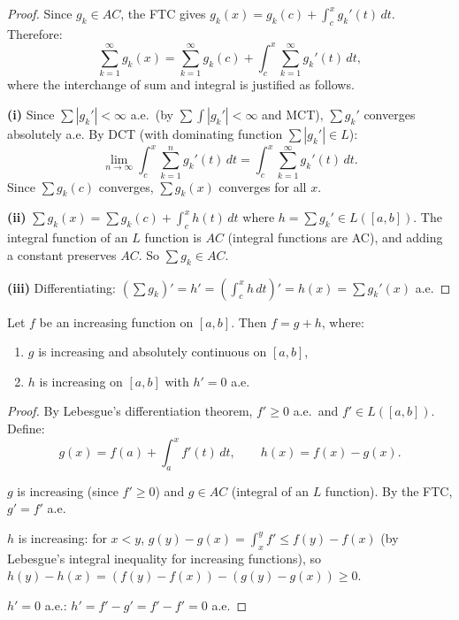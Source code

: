 \documentclass[11pt]{report}
\begin{document}
\begin{proof}
Since $g_k \in AC$, the FTC gives $g_k(x) = g_k(c) + \int_c^x g_k'(t)\,dt$. Therefore:
\[
\sum_{k=1}^{\infty} g_k(x) = \sum_{k=1}^{\infty} g_k(c) + \int_c^x \sum_{k=1}^{\infty} g_k'(t)\,dt,
\]
where the interchange of sum and integral is justified as follows.

\textbf{(i)} Since $\sum |g_k'| < \infty$ a.e.\ (by $\sum \int |g_k'| < \infty$ and MCT), $\sum g_k'$ converges absolutely a.e. By DCT (with dominating function $\sum |g_k'| \in L$):
\[
\lim_{n \to \infty} \int_c^x \sum_{k=1}^{n} g_k'(t)\,dt = \int_c^x \sum_{k=1}^{\infty} g_k'(t)\,dt.
\]
Since $\sum g_k(c)$ converges, $\sum g_k(x)$ converges for all $x$.

\textbf{(ii)} $\sum g_k(x) = \sum g_k(c) + \int_c^x h(t)\,dt$ where $h = \sum g_k' \in L([a, b])$. The integral function of an $L$ function is $AC$ (integral functions are AC), and adding a constant preserves $AC$. So $\sum g_k \in AC$.

\textbf{(iii)} Differentiating: $(\sum g_k)' = h' = (\int_c^x h\,dt)' = h(x) = \sum g_k'(x)$ a.e.
\end{proof}

\begin{thmbox}
Let $f$ be an increasing function on $[a, b]$. Then $f = g + h$, where:
\begin{enumerate}[label=(\roman*)]
\item $g$ is increasing and absolutely continuous on $[a, b]$,
\item $h$ is increasing on $[a, b]$ with $h' = 0$ a.e.
\end{enumerate}
\end{thmbox}

\begin{proof}
By Lebesgue's differentiation theorem, $f' \geq 0$ a.e.\ and $f' \in L([a, b])$. Define:
\[
g(x) = f(a) + \int_a^x f'(t)\,dt, \qquad h(x) = f(x) - g(x).
\]

$g$ is increasing (since $f' \geq 0$) and $g \in AC$ (integral of an $L$ function). By the FTC, $g' = f'$ a.e.

$h$ is increasing: for $x < y$, $g(y) - g(x) = \int_x^y f' \leq f(y) - f(x)$ (by Lebesgue's integral inequality for increasing functions), so $h(y) - h(x) = (f(y) - f(x)) - (g(y) - g(x)) \geq 0$.

$h' = 0$ a.e.: $h' = f' - g' = f' - f' = 0$ a.e.
\end{proof}
\end{document}
